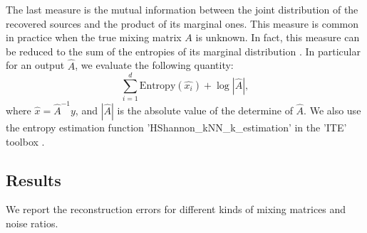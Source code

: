 \documentclass[twoside,11pt]{article}
\begin{document}
The last measure is the mutual information between the joint distribution of the recovered sources and the product of its marginal ones. 
This measure is common in practice when the true mixing matrix $A$ is unknown. 
In fact, this measure can be reduced to the sum of the entropies of its marginal distribution \citep{Learned-Miller:2003:IUS:945365.964306}. 
In particular for an output $\hat{A}$, we evaluate the following quantity:
\begin{equation}
\sum_{i = 1}^{d} \text{Entropy}(\hat{x_i}) + \log |\hat{A}|,
\end{equation}
where $\hat{x} = \hat{A}^{-1}y$, and $|\hat{A}|$ is the absolute value of the determine of $\hat{A}$. We also use the entropy estimation function 'HShannon\_kNN\_k\_estimation' in the 'ITE' toolbox \citep{szabo14information}. 
\fi

\subsection{Results}
\label{subsubsec:results}
We report the reconstruction errors for different kinds of mixing matrices and noise ratios.
\end{document}
